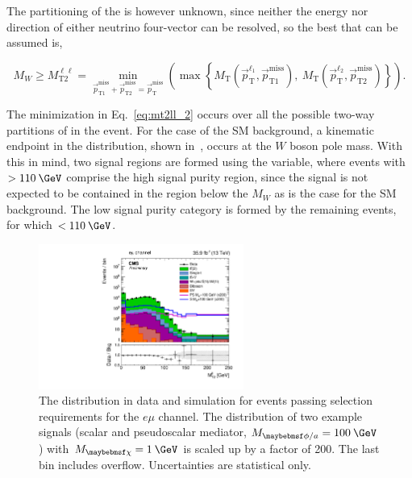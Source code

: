 The partitioning of the \ptvecmiss is however unknown, since neither the energy nor direction of either neutrino four-vector can be resolved, so the best that can be assumed is, 

\begin{equation}
  M_{W} \geq M_{\text{T2}}^{\ell\ell} = \min_{\vec{p}^{\text{miss}}_{\text{T1}}+\vec{p}^{\text{miss}}_{\text{T2}}=\vec{p}^{\text{miss}}_{\text{T}}}\left(\max\left\{M_{\text{T}}\left(\vec{p}^{\ell_1}_{\text{T}},\vec{p}^{\text{miss}}_{\text{T1}}\right),\:M_{\text{T}}\left(\vec{p}^{\ell_2}_{\text{T}},\vec{p}^{\text{miss}}_{\text{T2}}\right)\right\}\right).
\label{eq:mt2ll_2}
\end{equation}

The minimization in Eq.~\ref{eq:mt2ll_2} occurs over all the possible two-way partitions of \ptvecmiss in the event. For the case of the SM \ttll background, a kinematic endpoint in the \mttll distribution, shown in~, occurs at the $W$ boson pole mass. With this in mind, two signal regions are formed using the \mttll variable, where events with \mttll$>110\:\GeV$ comprise the high signal purity region, since the signal is not expected to be contained in the region below the $M_W$ as is the case for the SM \ttll background. The low signal purity category is formed by the remaining events, for which \mttll$<110\:\GeV$.

\begin{figure}
  \includegraphics[width=0.6\textwidth]{figs/mt2log_em.pdf}
  \caption{The \mttll distribution in data and simulation for events passing selection requirements for the $e\mu$ channel. The distribution of two example signals (scalar and pseudoscalar mediator, $M_{\phi/a} = 100\:\GeV$) with $M_{\chi}=1\:\GeV$ is scaled up by a factor of 200. The last bin includes overflow. Uncertainties are statistical only.}
  \label{fig:mt2ll}
\end{figure}
